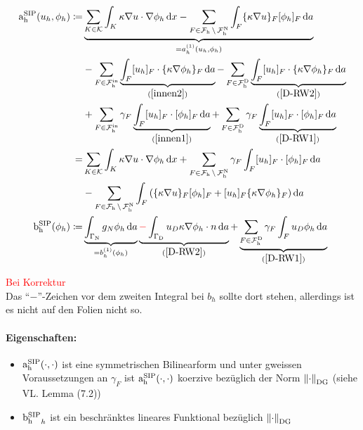 \begin{define}
	\begin{align*}
		\asip(u_h, \phi_h) \coloneqq &\underbrace{\sum_{K \in \mathcal{K}} \int_K \kappa \nabla u \cdot \nabla \phi_h \diff x - \sum_{F \in \F\setminus\FN } \int_{F} \{\kappa \nabla u \}_F [\phi_h]_F \diff a}_{= a_h^{(1)}(u_h, \phi_h)}\\
		&- \sum_{F \in \FIn} \underbrace{\int_F [u_h]_F \cdot \{ \kappa \nabla \phi_h \}_F \diff a}_{(\ref{innen2})} - \sum_{F \in \FD} \underbrace{\int_F [u_h]_F \cdot \{ \kappa \nabla \phi_h \}_F \diff a}_{(\ref{D-RW2})}\\
		&+\sum_{F \in \FIn} \gamma_F \underbrace{\int_F [u_h]_F \cdot [\phi_h]_F \diff a}_{(\ref{innen1})} + \sum_{F \in \FD} \gamma_F \underbrace{\int_F [u_h]_F \cdot [\phi_h]_F \diff a}_{(\ref{D-RW1})}\\
		=& \sum_{K \in \mathcal{K}} \int_K \kappa \nabla u \cdot \nabla \phi_h \diff x + \sum_{F \in \F\setminus\FN}  \gamma_F \int_F [u_h]_F \cdot [\phi_h]_F \diff a\\
		&- \sum_{F \in \F\setminus\FN} \int_F \left(  \{\kappa \nabla u \}_F [\phi_h]_F + [u_h]_F \{\kappa \nabla \phi_h \}_F  \right) \diff a\\
		\bsip(\phi_h) \coloneqq & \underbrace{\int_{\GammaN} g_N \phi_h \diff a}_{=b_h^{(1)}(\phi_h)} \underbrace{\textcolor{red}{-} \int_{\GammaD} u_D \kappa \nabla \phi_h \cdot n \diff a}_{(\ref{D-RW2})} + \underbrace{\sum_{F \in \FD} \gamma_F \int_F u_D \phi_h \diff a}_{(\ref{D-RW1})}
	\end{align*}
\end{define}
\begin{remark}\textcolor{red}{Bei Korrektur}\\
	Das \enquote{$-$}-Zeichen vor dem zweiten Integral bei $ b_h $ sollte dort stehen, allerdings ist es nicht auf den Folien nicht so.
\end{remark}

\paragraph{Eigenschaften:}
\begin{itemize}
	\item $ \operatorname{a_h^{\text{SIP}}}(\cdot,\cdot) $ ist eine symmetrischen Bilinearform und unter gweissen Voraussetzungen an $ \gamma_F $ ist $ \operatorname{a_h^{\text{SIP}}}(\cdot,\cdot) $ koerzive bezüglich der Norm $ \norm{\cdot}_{\text{DG}} $ (siehe VL. Lemma (7.2))
	\item $ \operatorname{b_h^{\text{SIP}}}_h $ ist ein beschränktes lineares Funktional bezüglich $ \norm{\cdot}_{\text{DG}} $ 
\end{itemize}

